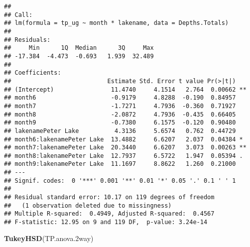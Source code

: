 \documentclass[]{article}
\newenvironment{Shaded}{\begin{snugshade}}{\end{snugshade}}
\newcommand{\FloatTok}[1]{\textcolor[rgb]{0.00,0.00,0.81}{#1}}
\newcommand{\KeywordTok}[1]{\textcolor[rgb]{0.13,0.29,0.53}{\textbf{#1}}}
\newcommand{\NormalTok}[1]{#1}
\begin{document}
\begin{verbatim}
## 
## Call:
## lm(formula = tp_ug ~ month * lakename, data = Depths.Totals)
## 
## Residuals:
##     Min      1Q  Median      3Q     Max 
## -17.384  -4.473  -0.693   1.939  32.489 
## 
## Coefficients:
##                           Estimate Std. Error t value Pr(>|t|)   
## (Intercept)                11.4740     4.1514   2.764  0.00662 **
## month6                     -0.9179     4.8288  -0.190  0.84957   
## month7                     -1.7271     4.7936  -0.360  0.71927   
## month8                     -2.0872     4.7936  -0.435  0.66405   
## month9                     -0.7380     6.1575  -0.120  0.90480   
## lakenamePeter Lake          4.3136     5.6574   0.762  0.44729   
## month6:lakenamePeter Lake  13.4882     6.6207   2.037  0.04384 * 
## month7:lakenamePeter Lake  20.3440     6.6207   3.073  0.00263 **
## month8:lakenamePeter Lake  12.7937     6.5722   1.947  0.05394 . 
## month9:lakenamePeter Lake  11.1697     8.8622   1.260  0.21000   
## ---
## Signif. codes:  0 '***' 0.001 '**' 0.01 '*' 0.05 '.' 0.1 ' ' 1
## 
## Residual standard error: 10.17 on 119 degrees of freedom
##   (1 observation deleted due to missingness)
## Multiple R-squared:  0.4949, Adjusted R-squared:  0.4567 
## F-statistic: 12.95 on 9 and 119 DF,  p-value: 3.24e-14
\end{verbatim}

\begin{Shaded}
\begin{Highlighting}[]
\KeywordTok{TukeyHSD}\NormalTok{(TP.anova}\FloatTok{.2}\NormalTok{way)}
\end{Highlighting}
\end{Shaded}
\end{document}

